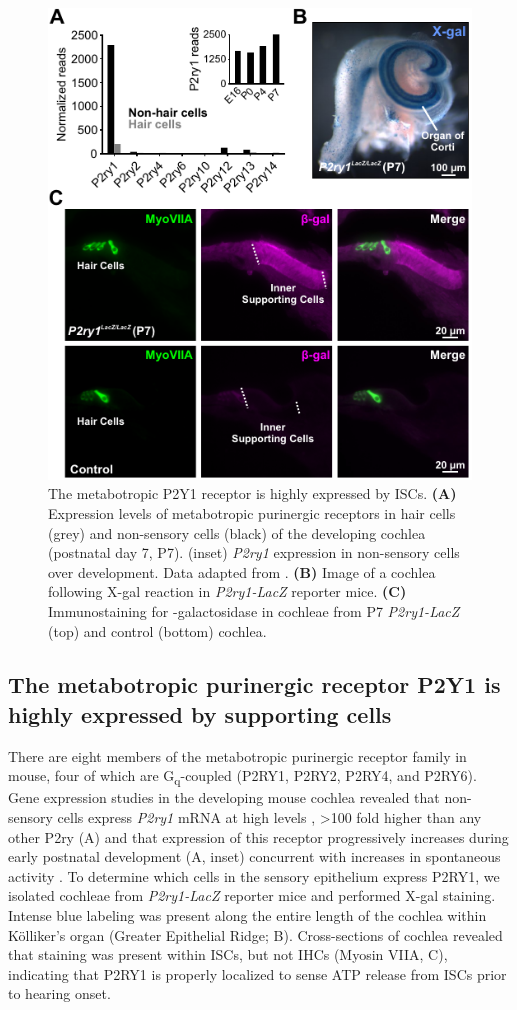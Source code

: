 \documentclass[9pt,lineno]{elife}
\begin{document}
\begin{figure}
\includegraphics[width=.63\linewidth]{figures/Fig2.pdf}
\caption{The metabotropic P2Y1 receptor is highly expressed by ISCs.
\textbf{(A)} Expression levels of metabotropic purinergic receptors in hair cells (grey) and non-sensory cells (black) of the developing cochlea (postnatal day 7, P7). (inset) \textit{P2ry1} expression in non-sensory cells over development. Data adapted from \cite{Scheffer2015}.
\textbf{(B)} Image of a cochlea following X-gal reaction in \textit{P2ry1-LacZ} reporter mice.
\textbf{(C)} Immunostaining for \textbeta-galactosidase in cochleae from P7 \textit{P2ry1-LacZ} (top) and control (bottom) cochlea.
}
\label{fig:f2}
\end{figure}

\subsection{The metabotropic purinergic receptor P2Y1 is highly expressed by supporting cells}
There are eight members of the metabotropic purinergic receptor family in mouse, four of which are G\textsubscript{q}-coupled (P2RY1, P2RY2, P2RY4, and P2RY6). Gene expression studies in the developing mouse cochlea revealed that non-sensory cells express \textit{P2ry1} mRNA at high levels \citep{Scheffer2015}, >100 fold higher than any other P2ry (A) and that expression of this receptor progressively increases during early postnatal development (A, inset) concurrent with increases in spontaneous activity \citep{Tritsch2010}. To determine which cells in the sensory epithelium express P2RY1, we isolated cochleae from \textit{P2ry1-LacZ} reporter mice and performed X-gal staining. Intense blue labeling was present along the entire length of the cochlea within Kölliker’s organ (Greater Epithelial Ridge; B). Cross-sections of cochlea revealed that staining was present within ISCs, but not IHCs (Myosin VIIA, C), indicating that P2RY1 is properly localized to sense ATP release from ISCs prior to hearing onset.
\end{document}
